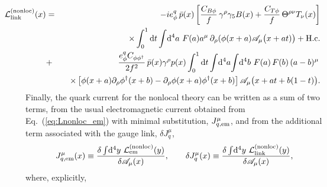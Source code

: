 \documentclass[preprintnumbers,prd,superscriptaddress,preprint]{revtex4-1}
\begin{document}
\begin{eqnarray}
\hspace*{-1cm}{\cal L}^{\rm (nonloc)}_{\rm link}(x)
&=& -i e^q_\phi\, \bar{p}(x)
    \left[ \frac{C_{B\phi}}{f}\, \gamma^\rho \gamma_5 B(x)
	     + \frac{C_{T\phi}}{f}\, \Theta^{\rho\nu} T_\nu(x)
    \right]
\notag\\
& & \hspace*{0.3cm} \times
    \int_0^1 \dd{t} \int\!\dd[4]{a}\,  %
    F(a) a^\mu\, \partial_\rho (\phi(x+a) \mathscr{A}_\mu\big(x+at)\big)
    + {\rm H.c.}
\notag\\
&+& \frac{e^q_\phi C_{\phi\phi^\dag}}{2f^2}\,
    \bar{p}(x) \gamma^\rho p(x)
    \int_0^1 \dd{t} \int\!\dd[4]{a}\! \int\!\dd[4]{b}\, %
	F(a)\, F(b)\, (a-b)^\mu\,
\notag\\
& & \hspace*{0.3cm} \times
    \left[ \phi(x+a) \partial_\rho \phi^\dag(x+b)
	     - \partial_\rho \phi(x+a) \phi^\dag(x+b)
    \right] \mathscr{A}_\mu\big(x+at+b(1-t)\big).
\label{eq:Lnonloc_link}
\end{eqnarray}
%
Finally, the quark current for the nonlocal theory can be written as a sum of two terms, from the usual electromagnetic current obtained from Eq.~(\ref{eq:Lnonloc_em}) with minimal substitution, $J_{q, \rm em}^\mu$, and from the additional term associated with the gauge link, $\delta J_q^\mu$,
%
\begin{equation}
J_{q, \rm em}^\mu(x)
\equiv \frac{\delta \int\!\dd[4]{y}\,
		{\cal L}_{\rm em}^{\rm (nonloc)}(y)}
	      {\delta \mathscr{A_\mu}(x)}, 
\qquad
%
\delta J_q^\mu(x)
\equiv \frac{\delta \int\!\dd[4]{y}\, {\cal L}^{\rm (nonloc)}_{\rm link}(y)}
              {\delta \mathscr{A_\mu}(x)},
\end{equation}
%
where, explicitly,
%
\end{document}

